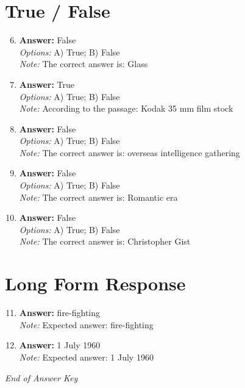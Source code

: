 \documentclass[12pt]{article}
\begin{document}
\section*{True / False}
\begin{enumerate}[label=\arabic*.]
\setcounter{enumi}{5}
\item \textbf{Answer:} False
\\ \textit{Options:} A) True; B) False
\\ \textit{Note:} The correct answer is: Glass
\item \textbf{Answer:} True
\\ \textit{Options:} A) True; B) False
\\ \textit{Note:} According to the passage: Kodak 35 mm film stock
\item \textbf{Answer:} False
\\ \textit{Options:} A) True; B) False
\\ \textit{Note:} The correct answer is: overseas intelligence gathering
\item \textbf{Answer:} False
\\ \textit{Options:} A) True; B) False
\\ \textit{Note:} The correct answer is: Romantic era
\item \textbf{Answer:} False
\\ \textit{Options:} A) True; B) False
\\ \textit{Note:} The correct answer is: Christopher Gist
\end{enumerate}

\section*{Long Form Response}
\begin{enumerate}[label=\arabic*.]
\setcounter{enumi}{10}
\item \textbf{Answer:} fire-fighting
\\ \textit{Note:} Expected answer: fire-fighting
\item \textbf{Answer:} 1 July 1960
\\ \textit{Note:} Expected answer: 1 July 1960
\end{enumerate}

\vfill
\noindent\textit{End of Answer Key}
\end{document}
